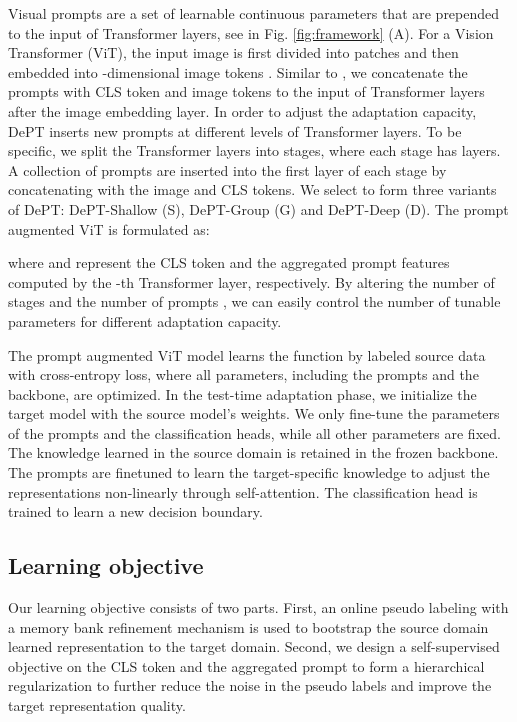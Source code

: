 \documentclass{article} \usepackage{iclr2023_conference,times}
\begin{document}
Visual prompts are a set of learnable continuous parameters that are prepended to the input of Transformer layers, see in Fig. \ref{fig:framework} (A). For a Vision Transformer (ViT), the input image is first divided into patches and then embedded into -dimensional image tokens . Similar to \citet{jia2022visual}, we concatenate the prompts with CLS token and image tokens to the input of Transformer layers after the image embedding layer. In order to adjust the adaptation capacity, DePT inserts new prompts at different levels of Transformer layers. To be specific, we split the Transformer layers into  stages, where each stage has  layers. A collection of  prompts  are inserted into the first layer of each stage by concatenating with the image and CLS tokens. We select  to form three variants of DePT: DePT-Shallow (S), DePT-Group (G) and DePT-Deep (D). The prompt augmented ViT is formulated as:

where  and  represent the CLS token and the aggregated prompt features computed by the -th Transformer layer, respectively. By altering the number of stages  and the number of prompts , we can easily control the number of tunable parameters for different adaptation capacity.

The prompt augmented ViT model learns the function  by labeled source data with cross-entropy loss, where all parameters, including the prompts and the backbone, are optimized. In the test-time adaptation phase, we initialize the target model with the source model's weights. We only fine-tune the parameters of the prompts and the classification heads, while all other parameters are fixed. The knowledge learned in the source domain is retained in the frozen backbone. The prompts are finetuned to learn the target-specific knowledge to adjust the representations non-linearly through self-attention. The classification head is trained to learn a new decision boundary.



\subsection{Learning objective} 
Our learning objective consists of two parts. First, an online pseudo labeling with a memory bank refinement mechanism is used to bootstrap the source domain learned representation to the target domain. Second, we design a self-supervised objective on the CLS token and the aggregated prompt to form a hierarchical regularization to further reduce the noise in the pseudo labels and improve the target representation quality.
\end{document}
